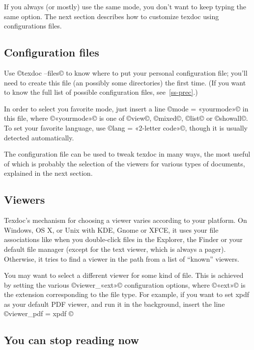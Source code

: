 \documentclass[a4paper, oneside]{scrartcl}
\begin{document}
If you always (or mostly) use the same mode, you don't want to keep typing the
same option. The next section describes how to customize texdoc using
configurations files.

\subsection{Configuration files}\label{ss-quick-file}

Use ©texdoc --files© to know where to put your personal configuration file;
you'll need to create this file (an possibly some directories) the first time.
(If you want to know the full list of possible configuration files,
see~\ref{ss-prec}.)

In order to select you favorite mode, just insert a line ©mode = «yourmode»©
in this file, where ©«yourmode»© is one of ©view©, ©mixed©, ©list© or
©showall©. To set your favorite language, use ©lang = «2-letter code»©, though
it is usually detected automatically.

The configuration file can be used to tweak texdoc in many ways, the most
useful of which is probably the selection of the viewers for various types of
documents, explained in the next section.

\subsection{Viewers}\label{ss-viewer}

Texdoc's mechanism for choosing a viewer varies according to your platform.
On Windows, OS X, or Unix with KDE, Gnome or XFCE, it uses your file
associations like when you double-click files in the Explorer, the Finder or
your default file manager (except for the text viewer, which is always a
pager). Otherwise, it tries to find a viewer in the path from a list of
``known'' viewers.

You may want to select a different viewer for some kind of file. This is
achieved by setting the various ©viewer_«ext»© configuration options, where
©«ext»© is the extension corresponding to the file type. For example, if you
want to set xpdf as your default PDF viewer, and run it in the background,
insert the line ©viewer_pdf = xpdf %
©%

\subsection{You can stop reading now}
\end{document}
